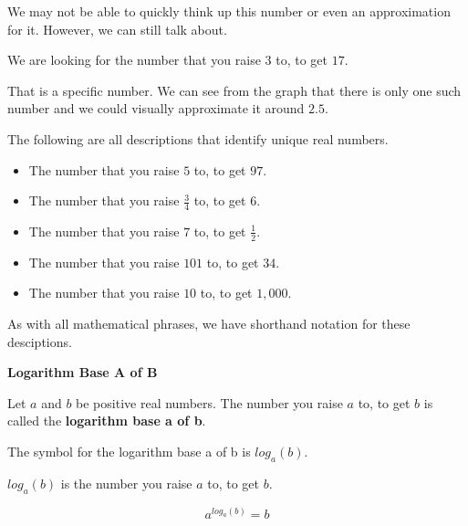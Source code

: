 \documentclass{ximera}
\begin{document}
We may not be able to quickly think up this number or even an approximation for it.  However, we can still talk about.

\begin{center}
We are looking for the number that you raise $3$ to, to get $17$.
\end{center}


That is a specific number. We can see from the graph that there is only one such number and we could visually approximate it around $2.5$.


\begin{example}
The following are all descriptions that identify unique real numbers.

\begin{itemize}
\item The number that you raise $5$ to, to get $97$.
\item The number that you raise $\frac{3}{4}$ to, to get $6$.
\item The number that you raise $7$ to, to get $\frac{1}{2}$.
\item The number that you raise $101$ to, to get $34$.
\item The number that you raise $10$ to, to get $1,000$.
\end{itemize}

\end{example}



As with all mathematical phrases, we have shorthand notation for these desciptions.








\begin{definition} \textbf{\textcolor{green!50!black}{Logarithm Base A of B}}

Let $a$ and $b$ be positive real numbers.  The number  you raise $a$ to, to get $b$ is called the \textbf{logarithm base a of b}.

The symbol for the logarithm base a of b is $log_a(b)$.


$log_a(b)$ is  the number you raise $a$ to, to get $b$.

\[     a^{log_a(b)} = b          \]




\end{definition}
\end{document}
